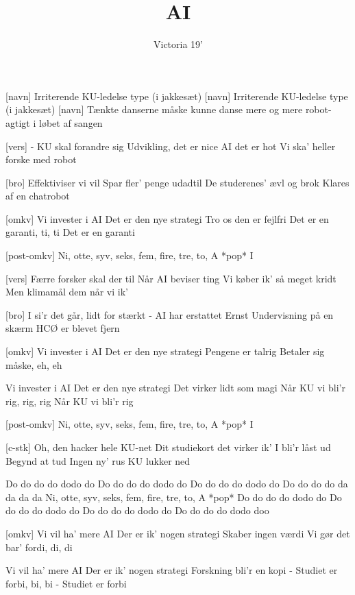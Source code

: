 \documentclass[a4paper,11pt]{article}
\title{AI}
\author{Victoria 19'}
\begin{document}
\maketitle

\begin{roles}
[navn] Irriterende KU-ledelse type (i jakkesæt)
[navn] Irriterende KU-ledelse type (i jakkesæt)
[navn] Tænkte danserne måske kunne danse mere og mere robot-agtigt i løbet af sangen 
\end{roles}



\begin{song}
  [vers] - KU skal forandre sig
  Udvikling, det er nice
  AI det er hot
  Vi ska' heller forske med robot

  [bro] Effektiviser vi vil
  Spar fler' penge udadtil
  De studerenes' ævl og brok
  Klares af en chatrobot

[omkv] Vi invester i AI
Det er den nye strategi
Tro os den er fejlfri
Det er en garanti, ti, ti
Det er en garanti

[post-omkv] Ni, otte, syv, seks, fem, fire, tre, to, A *pop* I

[vers] Færre forsker skal der til 
Når AI beviser ting
Vi køber ik' så meget kridt
Men klimamål dem når vi ik'

[bro] I si'r det går, lidt for stærkt
- AI har erstattet Ernst
Undervisning på en skærm
HCØ er blevet fjern

[omkv] Vi invester i AI
Det er den nye strategi
Pengene er talrig
Betaler sig måske, eh, eh

Vi invester i AI 
Det er den nye strategi
Det virker lidt som magi
Når KU vi bli'r rig, rig, rig
Når KU vi bli'r rig

[post-omkv] Ni, otte, syv, seks, fem, fire, tre, to, A *pop* I

[c-stk] Oh, den hacker hele KU-net
Dit studiekort det virker ik' 
I bli'r låst ud
Begynd at tud
Ingen ny' rus
KU lukker ned

 Do do do do dodo do
Do do do do dodo do
Do do do do dodo do
Do do do do da da da da
 Ni, otte, syv, seks, fem, fire, tre, to, A *pop* 
 Do do do do dodo do
Do do do do dodo do
Do do do do dodo do
Do do do do dodo doo

[omkv] Vi vil ha' mere AI
Der er ik' nogen strategi 
Skaber ingen værdi
Vi gør det bar' fordi, di, di

Vi vil ha' mere AI
Der er ik' nogen strategi
Forskning bli'r en kopi
- Studiet er forbi, bi, bi
- Studiet er forbi

  
\end{song}
\end{document}
